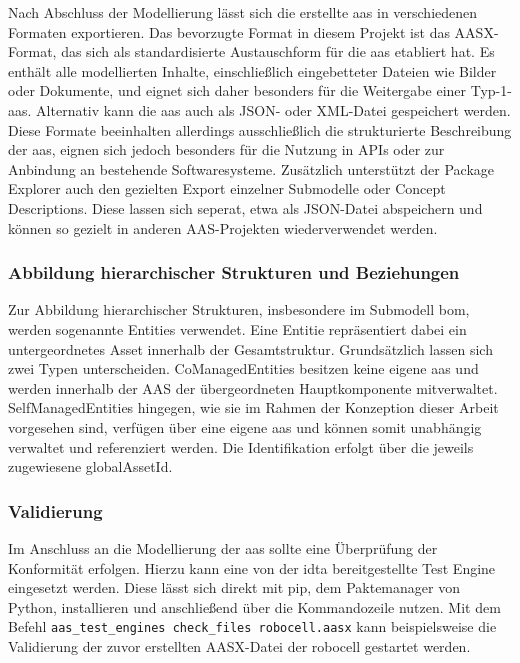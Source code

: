 Nach Abschluss der Modellierung lässt sich die erstellte \acs{aas} in verschiedenen Formaten exportieren.
Das bevorzugte Format in diesem Projekt ist das AASX-Format, das sich als standardisierte Austauschform für die \acs{aas} etabliert hat.
Es enthält alle modellierten Inhalte, einschließlich eingebetteter Dateien wie Bilder oder Dokumente, und eignet sich daher besonders für die Weitergabe einer Typ-1-\acs{aas}.
Alternativ kann die \acs{aas} auch als JSON- oder XML-Datei gespeichert werden.
Diese Formate beeinhalten allerdings ausschließlich die strukturierte Beschreibung der \acs{aas}, eignen sich jedoch besonders für die Nutzung in APIs oder zur Anbindung an bestehende Softwaresysteme.
Zusätzlich unterstützt der Package Explorer auch den gezielten Export einzelner Submodelle oder Concept Descriptions.
Diese lassen sich seperat, etwa als JSON-Datei abspeichern und können so gezielt in anderen AAS-Projekten wiederverwendet werden.

\subsubsection{Abbildung hierarchischer Strukturen und Beziehungen}
Zur Abbildung hierarchischer Strukturen, insbesondere im Submodell \acs{bom}, werden sogenannte Entities verwendet. 
Eine Entitie repräsentiert dabei ein untergeordnetes Asset innerhalb der Gesamtstruktur. 
Grundsätzlich lassen sich zwei Typen unterscheiden. 
CoManagedEntities besitzen keine eigene \acs{aas} und werden innerhalb der AAS der übergeordneten Hauptkomponente mitverwaltet. 
SelfManagedEntities hingegen, wie sie im Rahmen der Konzeption dieser Arbeit vorgesehen sind, verfügen über eine eigene \acs{aas} und können somit unabhängig verwaltet und referenziert werden. 
Die Identifikation erfolgt über die jeweils zugewiesene globalAssetId.

\subsubsection{Validierung}
Im Anschluss an die Modellierung der \acs{aas} sollte eine Überprüfung der Konformität erfolgen.
Hierzu kann eine von der \acs{idta} bereitgestellte Test Engine \cite{TestEngine} eingesetzt werden. 
Diese lässt sich direkt mit pip, dem Paktemanager von Python, installieren und anschließend über die Kommandozeile nutzen.
Mit dem Befehl \verb|aas_test_engines check_files robocell.aasx| kann beispielsweise die Validierung der zuvor erstellten AASX-Datei der robocell gestartet werden.

